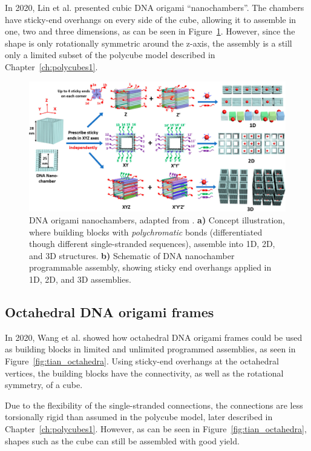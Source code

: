 In 2020, Lin et al.\cite{nano-chambers_lin2020} presented cubic DNA origami ``nanochambers''. The chambers have sticky-end overhangs on every side of the cube, allowing it to assemble in one, two and three dimensions, as can be seen in Figure~\ref{fig:nanochambers}. However, since the shape is only rotationally symmetric around the z-axis, the assembly is a still only a limited subset of the polycube model described in Chapter~\ref{ch:polycubes1}. 

\begin{figure}[h!]
  \centering
  \includegraphics{figures/nanochambers2.jpeg}
  \caption{DNA origami nanochambers, adapted from \cite{nano-chambers_lin2020}. \textbf{a)} Concept illustration, where building blocks with \emph{polychromatic} bonds (differentiated though different single-stranded sequences), assemble into 1D, 2D, and 3D structures. \textbf{b)} Schematic of DNA nanochamber programmable assembly, showing sticky end overhangs applied in 1D, 2D, and 3D assemblies.}
  \label{fig:nanochambers}
\end{figure}

\subsection{Octahedral DNA origami frames}
In 2020, Wang et al. \cite{tian_octahedra2020} showed how octahedral DNA origami frames could be used as building blocks in limited and unlimited programmed assemblies, as seen in Figure~\ref{fig:tian_octahedra}. Using sticky-end overhangs at the octahedral vertices, the building blocks have the connectivity, as well as the rotational symmetry, of a cube.

Due to the flexibility of the single-stranded connections, the connections are less torsionally rigid than assumed in the polycube model, later described in Chapter~\ref{ch:polycubes1}. However, as can be seen in Figure~\ref{fig:tian_octahedra}, shapes such as the cube can still be assembled with good yield.

